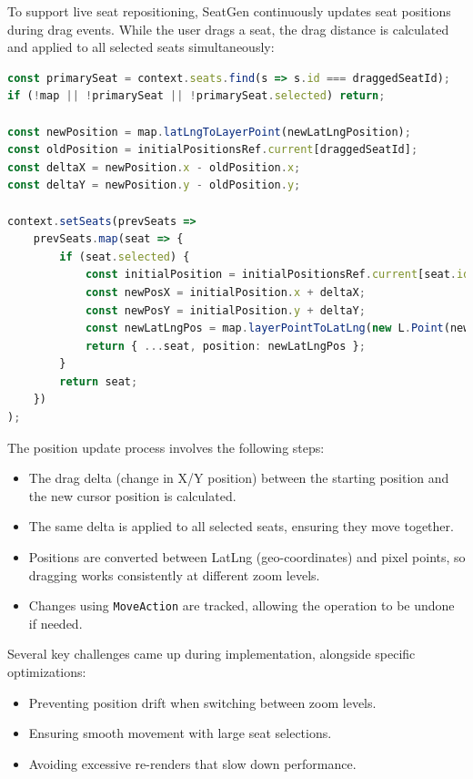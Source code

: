 To support live seat repositioning, SeatGen continuously updates seat positions during drag events. While the user drags a seat, the drag distance is calculated and applied to all selected seats simultaneously:

\begin{lstlisting}[language=TypeScript, caption=Updating Seat Positions During Dragging, label=lst:seat-live-dragging]
const primarySeat = context.seats.find(s => s.id === draggedSeatId);
if (!map || !primarySeat || !primarySeat.selected) return;

const newPosition = map.latLngToLayerPoint(newLatLngPosition);
const oldPosition = initialPositionsRef.current[draggedSeatId];
const deltaX = newPosition.x - oldPosition.x;
const deltaY = newPosition.y - oldPosition.y;

context.setSeats(prevSeats =>
    prevSeats.map(seat => {
        if (seat.selected) {
            const initialPosition = initialPositionsRef.current[seat.id];
            const newPosX = initialPosition.x + deltaX;
            const newPosY = initialPosition.y + deltaY;
            const newLatLngPos = map.layerPointToLatLng(new L.Point(newPosX, newPosY));
            return { ...seat, position: newLatLngPos };
        }
        return seat;
    })
);
\end{lstlisting}

The position update process involves the following steps:
\begin{itemize}
    \item The drag delta (change in X/Y position) between the starting position and the new cursor position is calculated.
    \item The same delta is applied to all selected seats, ensuring they move together.
    \item Positions are converted between LatLng (geo-coordinates) and pixel points, so dragging works consistently at different zoom levels.
    \item Changes using \texttt{MoveAction} are tracked, allowing the operation to be undone if needed.
\end{itemize}

Several key challenges came up during implementation, alongside specific optimizations:
\begin{itemize}
    \item Preventing position drift when switching between zoom levels.
    \item Ensuring smooth movement with large seat selections.
    \item Avoiding excessive re-renders that slow down performance.
\end{itemize}


